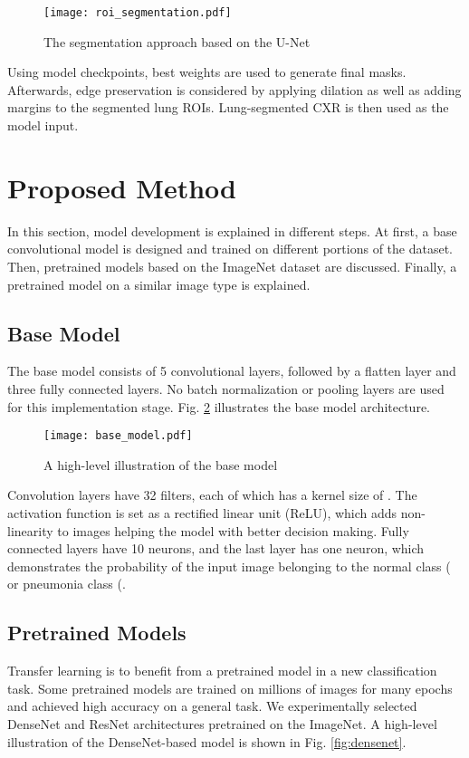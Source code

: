 \documentclass{article}
\begin{document}
\begin{figure}[H]
    \centering
    \texttt{[image: roi\_segmentation.pdf]}
    \caption{The segmentation approach based on the U-Net}
    \label{fig:segmentation}
\end{figure}

\noindent Using model checkpoints, best weights are used to generate final masks. Afterwards, edge preservation is considered by applying dilation as well as adding margins to the segmented lung ROIs. Lung-segmented CXR is then used as the model input.


\section{Proposed Method}
In this section, model development is explained in different steps. At first, a base convolutional model is designed and trained on different portions of the dataset. Then, pretrained models based on the ImageNet dataset are discussed. Finally, a pretrained model on a similar image type is explained. 

\subsection{Base Model} \label{base_model}
The base model consists of 5 convolutional layers, followed by a flatten layer and three fully connected layers. No batch normalization or pooling layers are used for this implementation stage. Fig. \ref{fig:base_model} illustrates the base model architecture.

\begin{figure}[H]
    \centering
    \texttt{[image: base\_model.pdf]}
    \caption{A high-level illustration of the base model}
    \label{fig:base_model}
\end{figure}

\noindent Convolution layers have 32 filters, each of which has a kernel size of . The activation function is set as a rectified linear unit (ReLU), which adds non-linearity to images helping the model with better decision making. Fully connected layers have 10 neurons, and the last layer has one neuron, which demonstrates the probability of the input image belonging to the normal class ( or pneumonia class (. 

\subsection{Pretrained Models}
Transfer learning is to benefit from a pretrained model in a new classification task. Some pretrained models are trained on millions of images for many epochs and achieved high accuracy on a general task. We experimentally selected DenseNet and ResNet architectures pretrained on the ImageNet. A high-level illustration of the DenseNet-based model is shown in Fig. \ref{fig:densenet}.
\end{document}

